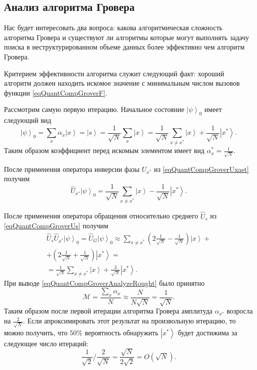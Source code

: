 \subsection{Анализ алгоритма Гровера}

Нас будет интересовать два вопроса: какова алгоритмическая сложность
алгоритма Гровера и существуют ли алгоритмы которые могут выполнять
задачу поиска в неструктурированном объеме данных более эффективно чем
алгоритм Гровера.

Критерием эффективности алгоритма служит следующий факт: хороший
алгоритм должен находить искомое значение с минимальным числом вызовов
функции \eqref{eqQuantCompGroverF}.

Рассмотрим самую первую итерацию. Начальное состояние
$\left|\psi\right>_0$ имеет следующий вид
\begin{equation}
\left|\psi\right>_0 =
\sum_x \alpha_x \left|x\right> =  
\left|s\right> = 
\frac{1}{\sqrt{N}}\sum_x \left|x\right> = 
\frac{1}{\sqrt{N}}\sum_{x\ne x^{\ast}} \left|x\right> +
\frac{1}{\sqrt{N}} \left|x^{\ast}\right>.
\nonumber
\end{equation}
Таким образом коэффициент перед искомым элементом имеет вид
$\alpha_x^{\ast} = \frac{1}{\sqrt{N}}$. 

После применения оператора инверсии
фазы $U_{x^{\ast}}$ из \eqref{eqQuantCompGroverUxast} получим
\begin{equation}
\hat{U}_{x^{\ast}} \left|\psi\right>_0 =
\frac{1}{\sqrt{N}}\sum_{x\ne x^{\ast}} \left|x\right> - 
\frac{1}{\sqrt{N}} \left|x^{\ast}\right>.
\nonumber
\end{equation}

После применения оператора обращения относительно среднего $\hat{U}_s$ 
из \eqref{eqQuantCompGroverUs} получим
\begin{eqnarray}
\hat{U}_s \hat{U}_{x^{\ast}} \left|\psi\right>_0 = 
\hat{U}_G \left|\psi\right>_0 \approx 
\sum_{x\ne x^{\ast}} \left( 2 \frac{1}{\sqrt{N}} - \frac{1}{\sqrt{N}}
\right) \left|x\right> + 
\nonumber \\
+ \left( 2 \frac{1}{\sqrt{N}} +
\frac{1}{\sqrt{N}} \right) \left|x^{\ast}\right> = 
\nonumber \\
= 
\frac{1}{\sqrt{N}}\sum_{x\ne x^{\ast}} \left|x\right> + 
\frac{3}{\sqrt{N}} \left|x^{\ast}\right>.
\label{eqQuantCompGroverAnalyzeRought}
\end{eqnarray}
При выводе \eqref{eqQuantCompGroverAnalyzeRought} было принятно 
\[
\mathcal{M} = \frac{\sum_x \alpha_x}{N} \approx
\frac{N}{N \sqrt{N}} = \frac{1}{\sqrt{N}}.
\]
Таким образом после первой итерации алгоритма Гровера амплитуда
$\alpha_{x^{\ast}}$ возросла на $\frac{2}{\sqrt{N}}$. Если
апроксимировать этот результат на произвольную итерацию, то можно
получить, что $50\%$ вероятность обнаружить $\left|x^{\ast}\right>$
будет достижима за следующее число итераций:
\[
\frac{1}{\sqrt{2}}/\frac{2}{\sqrt{N}} =
\frac{\sqrt{N}}{2 \sqrt{2}} = O\left(\sqrt{N}\right).
\]

